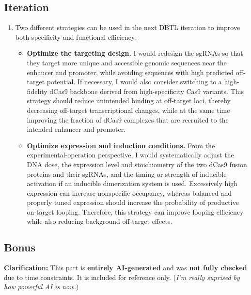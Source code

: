 \documentclass[12pt,a4paper]{article}
\begin{document}
\subsection{Iteration}
\begin{enumerate}[parsep=0.5\baselineskip]
  \item Two different strategies can be used in the next DBTL iteration to improve both specificity and functional efficiency:
  \begin{itemize}
    \item \textbf{Optimize the targeting design.} I would redesign the sgRNAs so that they target more unique and accessible genomic sequences near the enhancer and promoter, while avoiding sequences with high predicted off-target potential. If necessary, I would also consider switching to a high-fidelity dCas9 backbone derived from high-specificity Cas9 variants. This strategy should reduce unintended binding at off-target loci, thereby decreasing off-target transcriptional changes, while at the same time improving the fraction of dCas9 complexes that are recruited to the intended enhancer and promoter.
    \item \textbf{Optimize expression and induction conditions.} From the experimental-operation perspective, I would systematically adjust the DNA dose, the expression level and stoichiometry of the two dCas9 fusion proteins and their sgRNAs, and the timing or strength of inducible activation if an inducible dimerization system is used. Excessively high expression can increase nonspecific occupancy, whereas balanced and properly tuned expression should increase the probability of productive on-target looping. Therefore, this strategy can improve looping efficiency while also reducing background off-target effects.
  \end{itemize}
\end{enumerate}

\subsection{Bonus}
\textbf{Clarification:} This part is \textbf{entirely AI-generated} and was \textbf{not fully checked} due to time constraints. It is included for reference only. (\textit{I'm really suprised by how powerful AI is now.})
\end{document}
